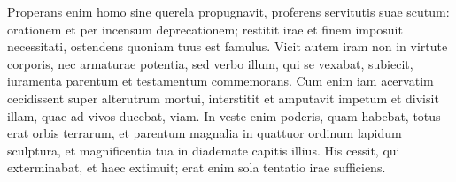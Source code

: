 \begin{biblechapter}
\verse Properans enim homo sine querela propugnavit, proferens servitutis suae scutum: orationem et per incensum deprecationem; restitit irae et finem imposuit necessitati, ostendens quoniam tuus est famulus. 
\verse Vicit autem iram non in virtute corporis, nec armaturae potentia, sed verbo illum, qui se vexabat, subiecit, iuramenta parentum et testamentum commemorans. 
\verse Cum enim iam acervatim cecidissent super alterutrum mortui, interstitit et amputavit impetum et divisit illam, quae ad vivos ducebat, viam. 
\verse In veste enim poderis, quam habebat, totus erat orbis terrarum, et parentum magnalia in quattuor ordinum lapidum sculptura, et magnificentia tua in diademate capitis illius. 
\verse His cessit, qui exterminabat, et haec extimuit; erat enim sola tentatio irae sufficiens. 
\end{biblechapter}

